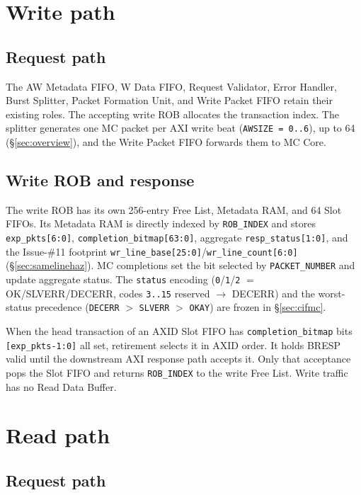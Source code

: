 \section{Write path}
\label{sec:writepath}
\subsection{Request path}

The AW Metadata FIFO, W Data FIFO, Request Validator, Error Handler, Burst
Splitter, Packet Formation Unit, and Write Packet FIFO retain their existing
roles.  The accepting write ROB allocates the transaction index.  The splitter
generates one MC packet per AXI write beat (\texttt{AWSIZE = 0..6}), up to 64
(\S\ref{sec:overview}), and the Write Packet FIFO forwards them to MC Core.

\subsection{Write ROB and response}

The write ROB has its own 256-entry Free List, Metadata RAM, and 64 Slot
FIFOs.  Its Metadata RAM is directly indexed by \texttt{ROB\_INDEX} and
stores \texttt{exp\_pkts[6:0]}, \texttt{completion\_bitmap[63:0]}, aggregate
\texttt{resp\_status[1:0]}, and the Issue-\#11 footprint
\texttt{wr\_line\_base[25:0]}/\texttt{wr\_line\_count[6:0]}
(\S\ref{sec:samelinehaz}).  MC completions set the bit selected by
\texttt{PACKET\_NUMBER} and update aggregate status.  The \texttt{status}
encoding (\texttt{0}/\texttt{1}/\texttt{2} $=$ OK/SLVERR/DECERR, codes
\texttt{3..15} reserved $\rightarrow$ DECERR) and the worst-status precedence
(\texttt{DECERR} $>$ \texttt{SLVERR} $>$ \texttt{OKAY}) are frozen in
\S\ref{sec:cifmc}.

When the head transaction of an AXID Slot FIFO has \texttt{completion\_bitmap}
bits \texttt{[exp\_pkts-1:0]} all set, retirement selects it in AXID
order.  It holds BRESP valid until the
downstream AXI response path accepts it.  Only that acceptance pops the Slot
FIFO and returns \texttt{ROB\_INDEX} to the write Free List.  Write traffic
has no Read Data Buffer.

\section{Read path}
\label{sec:readpath}
\subsection{Request path}

